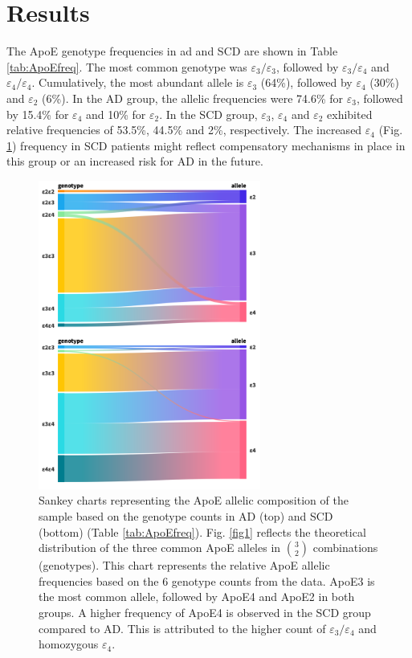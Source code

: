 \documentclass{amsart}
\begin{document}
\section{Results} \label{results}
The ApoE genotype frequencies in \acrshort{ad} and SCD are shown in Table \ref{tab:ApoEfreq}. The most common genotype was $\varepsilon_3/\varepsilon_3$, followed by $\varepsilon_3/\varepsilon_4$ and $\varepsilon_4/\varepsilon_4$. Cumulatively, the most abundant allele is $\varepsilon_3$ (64\%), followed by $\varepsilon_4$ (30\%) and $\varepsilon_2$ (6\%). In the AD group, the allelic frequencies were 74.6\% for $\varepsilon_3$, followed by 15.4\% for $\varepsilon_4$ and 10\% for $\varepsilon_2$. In the SCD group, $\varepsilon_3$, $\varepsilon_4$ and $\varepsilon_2$ exhibited relative frequencies of 53.5\%, 44.5\% and 2\%, respectively. The increased $\varepsilon_4$ (Fig. \ref{plot:sankey}) frequency in SCD patients might reflect compensatory mechanisms in place in this group or an increased risk for AD in the future.
\begin{figure}[H]
  \includegraphics[width=0.65\textwidth]{figures/sankey@2x.png}
    \caption{\label{plot:sankey} Sankey charts representing the ApoE allelic composition of the sample based on the genotype counts in AD (top) and SCD (bottom) (Table \ref{tab:ApoEfreq}). Fig. \ref{fig1} reflects the theoretical distribution of the three common ApoE alleles in $\binom{3}{2}$ combinations (genotypes). This chart represents the relative ApoE allelic frequencies based on the 6 genotype counts from the data. ApoE3 is the most common allele, followed by ApoE4 and ApoE2 in both groups. A higher frequency of ApoE4 is observed in the SCD group compared to AD. This is attributed to the higher count of $\varepsilon_3/\varepsilon_4$ and homozygous $\varepsilon_4$.}
\end{figure}
\end{document}
